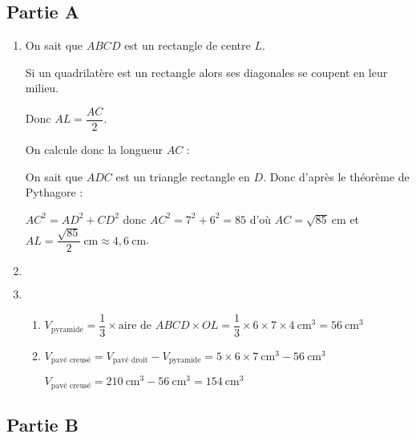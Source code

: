 \subsection*{Partie A}
\begin{enumerate}
\item On sait que $ABCD$ est un rectangle de centre $L$.

Si un quadrilatère est un rectangle alors ses diagonales se coupent en leur milieu.

Donc $AL =\dfrac{AC}{2}$. 

On calcule donc la longueur $AC$ :

On sait que $ADC$ est un triangle rectangle en $D$. Donc d’après le théorème de Pythagore :

$AC^2 = AD^2 + CD^2$ donc $AC^2 = 7^2+ 6^2= 85$ d'où $AC = \sqrt{85}~\text{cm}$ et $AL = \dfrac{\sqrt{85}}{2}~\text{cm} \approx 4,6~\text{cm}$.

\item $\phantom{X}$


\item
\begin{enumerate}
	\item $V_{\text{pyramide}} = \dfrac{1}{3}\times \text{aire de $ABCD$} \times OL = \dfrac{1}{3}\times 6 \times 7 \times 4~\text{cm}^3=56~\text{cm}^3$
	\item $V_{\text{pavé creusé}} = V_{\text{pavé droit}} - V_{\text{pyramide}} = 5\times 6\times 7~\text{cm}^3 - 56~\text{cm}^3$
	
	$V_{\text{pavé creusé}} =  210~\text{cm}^3 - 56~\text{cm}^3=154~\text{cm}^3$
\end{enumerate}
\end{enumerate}

\subsection*{Partie B}

